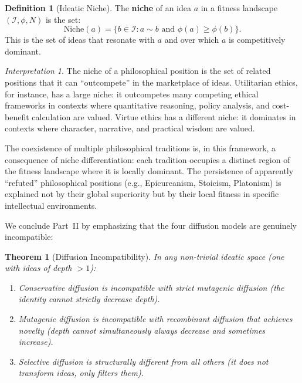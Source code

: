 \documentclass[11pt,openany]{book}
\theoremstyle{definition}
\newtheorem{definition}[axiom]{Definition}
\theoremstyle{plain}
\newtheorem{theorem}[axiom]{Theorem}
\theoremstyle{remark}
\newtheorem{interpretation}[axiom]{Interpretation}
\newcommand{\IS}{\mathcal{I}}               %
\newcommand{\res}{\sim}                      %
\begin{document}
\begin{definition}[Ideatic Niche]
The \textbf{niche} of an idea $a$ in a fitness landscape $(\IS, \phi, N)$ is the set:
\[
\mathrm{Niche}(a) = \{b \in \IS : a \res b \text{ and } \phi(a) \geq \phi(b)\}.
\]
This is the set of ideas that resonate with $a$ and over which $a$ is competitively dominant.
\end{definition}

\begin{interpretation}
The niche of a philosophical position is the set of related positions that it can ``outcompete'' in the marketplace of ideas. Utilitarian ethics, for instance, has a large niche: it outcompetes many competing ethical frameworks in contexts where quantitative reasoning, policy analysis, and cost-benefit calculation are valued. Virtue ethics has a different niche: it dominates in contexts where character, narrative, and practical wisdom are valued.

The coexistence of multiple philosophical traditions is, in this framework, a consequence of niche differentiation: each tradition occupies a distinct region of the fitness landscape where it is locally dominant. The persistence of apparently ``refuted'' philosophical positions (e.g., Epicureanism, Stoicism, Platonism) is explained not by their global superiority but by their local fitness in specific intellectual environments.
\end{interpretation}

We conclude Part~II by emphasizing that the four diffusion models are genuinely incompatible:

\begin{theorem}[Diffusion Incompatibility]
In any non-trivial ideatic space (one with ideas of depth $> 1$):
\begin{enumerate}
\item Conservative diffusion is incompatible with strict mutagenic diffusion (the identity cannot strictly decrease depth).
\item Mutagenic diffusion is incompatible with recombinant diffusion that achieves novelty (depth cannot simultaneously always decrease and sometimes increase).
\item Selective diffusion is structurally different from all others (it does not transform ideas, only filters them).
\end{enumerate}
\end{theorem}
\end{document}
